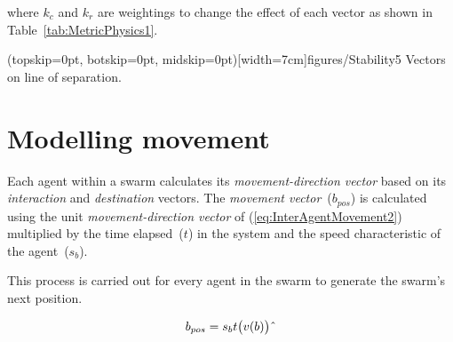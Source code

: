 \documentclass{ieeeaccess}
\begin{document}
where $k_c$ and $k_r$ are weightings to change the effect of each vector as shown in Table~\ref{tab:MetricPhysics1}.


\Figure[t!](topskip=0pt, botskip=0pt, midskip=0pt)[width=7cm]{figures/Stability5}
{Vectors on line of separation.\label{methods:Stability5}}


\section{Modelling movement}\label{sec:Movement1}
Each agent within a swarm calculates its \textit{movement-direction vector} based on its \textit{interaction} and \textit{destination} vectors. The \textit{movement vector}~($b_{pos}$) is calculated using the unit \textit{movement-direction vector} of (\ref{eq:InterAgentMovement2}) multiplied by the time elapsed~($t$) in the system and the speed characteristic of the agent~($s_b$).

This process is carried out for every agent in the swarm to generate the swarm's next position.

\begin{center}
\begin{equation}
\label{eq:AgentMovement}
b_{pos}=s_{b}t\big(v(b)\big)\string^ 
\end{equation}
\end{center}
\end{document}
